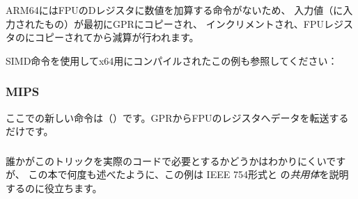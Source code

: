 ARM64にはFPUのDレジスタに数値を加算する命令がないため、
入力値（に入力されたもの）が最初に\ac{GPR}にコピーされ、
インクリメントされ、FPUレジスタのにコピーされてから減算が行われます。



SIMD命令を使用してx64用にコンパイルされたこの例も参照してください：

\subsubsection{MIPS}


ここでの新しい命令は（）です。\ac{GPR}からFPUのレジスタへデータを転送するだけです。



\subsubsection{\Conclusion}

誰かがこのトリックを実際のコードで必要とするかどうかはわかりにくいですが、
この本で何度も述べたように、この例は
IEEE 754形式と \CCpp の\emph{共用体}を説明するのに役立ちます。
